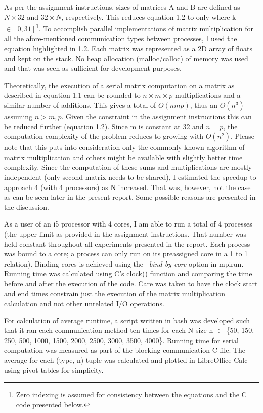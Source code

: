 \documentclass[12pt]{report}
\begin{document}
As per the assignment instructions, sizes of matrices A and B are defined as $N \times 32$ and $32 \times N$, respectively. This reduces equation 1.2 to only where k $\in [0,31]$\footnote{\label{^1}Zero indexing is assumed for consistency between the equations and the C code presented below.}. To accomplish parallel implementations of matrix multiplication for all the afore-mentioned communication types between processes, I used the equation highlighted in 1.2. Each matrix was represented as a 2D array of floats and kept on the stack. No heap allocation (malloc/calloc) of memory was used and that was seen as sufficient for development purposes.

Theoretically, the execution of a serial matrix computation on a matrix as described in equation 1.1 can be rounded to $n \times m \times p$ multiplications and a similar number of additions. This gives a total of $O(nmp)$, thus an $O(n^3)$ assuming $n>m,p$. Given the constraint in the assignment instructions this can be reduced further (equation 1.2). Since m is constant at 32 and $n=p$, the computation complexity of the problem reduces to growing with $O(n^2)$. Please note that this puts into consideration only the commonly known algorithm of matrix multiplication and others might be available with slightly better time complexity. Since the computation of these sums and multiplications are mostly independent (only second matrix needs to be shared), I estimated the speedup to approach 4 (with 4 processors) as N increased. That was, however, not the case as can be seen later in the present report. Some possible reasons are presented in the discussion.

As a user of an i5 processor with 4 cores, I am able to run a total of 4 processes (the upper limit as provided in the assignment instructions. That number was held constant throughout all experiments presented in the report. Each process was bound to a core; a process can only run on its preassigned core in a 1 to 1 relation). Binding cores is achieved using the \emph{--bind-by core} option in mpirun. Running time was calculated using C's clock() function and comparing the time before and after the execution of the code. Care was taken to have the clock start and end times constrain just the execution of the matrix multiplication calculation and not other unrelated I/O operations.

For calculation of average runtime, a script written in bash was developed such that it ran each communication method ten times for each N size n $\in$ \{50, 150, 250, 500, 1000, 1500, 2000, 2500, 3000, 3500, 4000\}. Running time for serial computation was measured as part of the blocking communication C file. The average for each (type, n) tuple was calculated and plotted in LibreOffice Calc using pivot tables for simplicity. 
\end{document}
